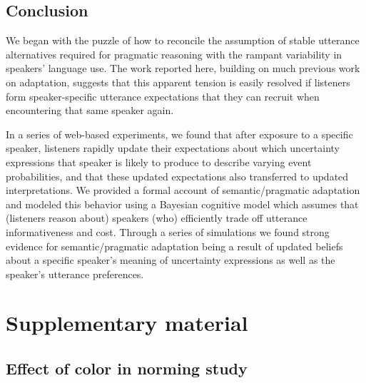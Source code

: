 \documentclass[man, floatsintext]{apa6}
\begin{document}
\subsection{Conclusion}

We began with the puzzle of how to reconcile the assumption of stable utterance alternatives required for  pragmatic reasoning with the rampant variability in speakers'  language use. The work reported here, building on much previous work on adaptation, suggests that this apparent tension is easily resolved if listeners form speaker-specific utterance expectations that they can recruit when encountering that same speaker again.

In a series of web-based experiments, we found that after exposure to a specific speaker, listeners rapidly update 
their expectations about which uncertainty expressions that speaker is likely to produce
to describe varying event probabilities, and that these updated expectations also transferred to updated interpretations.
We provided a formal account of semantic/pragmatic adaptation and modeled this behavior using a Bayesian cognitive model which assumes that (listeners reason about) speakers (who) efficiently trade off utterance informativeness and cost.
Through a series of simulations we found strong evidence for semantic/pragmatic adaptation being a result of
updated beliefs about a specific speaker's meaning of uncertainty expressions as well as the speaker's utterance
preferences. 



\printbibliography


\section*{Supplementary material}

\subsection*{Effect of color in norming study}
\end{document}
